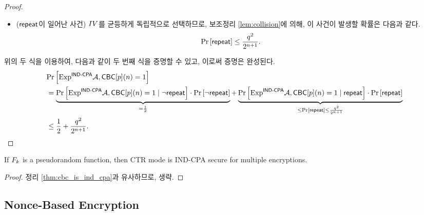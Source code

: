 \begin{proof}
\begin{itemize}
    \item ($\textsf{repeat}$이 일어난 사건) $IV$를 균등하게 독립적으로 선택하므로, 보조정리
          \ref{lem:collision}에 의해, 이 사건이 발생할 확률은 다음과 같다.
          \begin{equation}
            \text{Pr} \left[ \textsf{repeat} \right] \le \frac{q^2}{2^{n + 1}}.
          \end{equation}
  \end{itemize}
  위의 두 식을 이용하여, 다음과 같이 두 번째 식을 증명할 수 있고, 이로써 증명은 완성된다.
  \begin{equation}
    \begin{split}
      &\text{Pr} \left[ \text{Exp}^{\textsf{IND-CPA}}{\mathcal{A}, \textsf{CBC}[p]}(n) = 1 \right] \\
      &= \underbrace{
        \text{Pr} \left[ \text{Exp}^{\textsf{IND-CPA}}{\mathcal{A}, \textsf{CBC}[p]}(n) = 1 \;|\; \neg\textsf{repeat} \right]
        \cdot \text{Pr} \left[ \neg\textsf{repeat} \right]
      }_{= \frac{1}{2}}
      + \underbrace{
        \text{Pr} \left[ \text{Exp}^{\textsf{IND-CPA}}{\mathcal{A}, \textsf{CBC}[p]}(n) = 1 \;|\; \textsf{repeat} \right]
        \cdot \text{Pr} \left[ \textsf{repeat} \right]
      }_{\le \text{Pr} \left[ \textsf{repeat} \right] \le \frac{q^2}{2^{n + 1}}} \\
      &\le \frac{1}{2} + \frac{q^2}{2^{n + 1}}.
    \end{split}
  \end{equation}
\end{proof}

\newline

\begin{theorem} \label{thm:ctr_is_ind_cpa}
  If $F_{k}$ is a pseudorandom function, then CTR mode is \textsf{IND-CPA}
  secure for multiple encryptions.
\end{theorem}

\begin{proof}
  정리 \ref{thm:cbc_is_ind_cpa}과 유사하므로, 생략.
\end{proof}

\subsection*{Nonce-Based Encryption}


